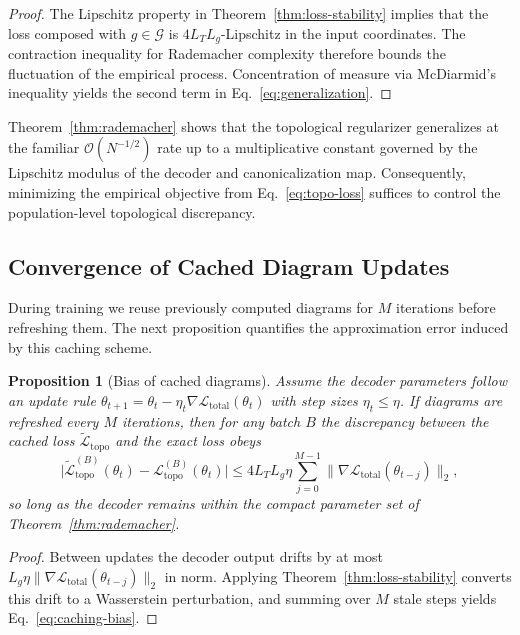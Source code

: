 \documentclass[11pt]{article}
\newtheorem{proposition}{Proposition}
\theoremstyle{definition}
\begin{document}
\begin{proof}
The Lipschitz property in Theorem~\ref{thm:loss-stability} implies that the loss composed with $g \in \mathcal{G}$ is $4 L_T L_g$-Lipschitz in the input coordinates. The contraction inequality for Rademacher complexity therefore bounds the fluctuation of the empirical process. Concentration of measure via McDiarmid's inequality yields the second term in Eq.~\eqref{eq:generalization}.
\end{proof}

Theorem~\ref{thm:rademacher} shows that the topological regularizer generalizes at the familiar $\mathcal{O}(N^{-1/2})$ rate up to a multiplicative constant governed by the Lipschitz modulus of the decoder and canonicalization map. Consequently, minimizing the empirical objective from Eq.~\eqref{eq:topo-loss} suffices to control the population-level topological discrepancy.

\subsection{Convergence of Cached Diagram Updates}
During training we reuse previously computed diagrams for $M$ iterations before refreshing them. The next proposition quantifies the approximation error induced by this caching scheme.

\begin{proposition}[Bias of cached diagrams]
\label{prop:caching}
Assume the decoder parameters follow an update rule $\theta_{t+1} = \theta_t - \eta_t \nabla \mathcal{L}_{\text{total}}(\theta_t)$ with step sizes $\eta_t \leq \eta$. If diagrams are refreshed every $M$ iterations, then for any batch $B$ the discrepancy between the cached loss $\widetilde{\mathcal{L}}_{\text{topo}}$ and the exact loss obeys
\begin{equation}
    \big| \widetilde{\mathcal{L}}_{\text{topo}}^{(B)}(\theta_t) - \mathcal{L}_{\text{topo}}^{(B)}(\theta_t) \big| \leq 4 L_T L_g \eta \sum_{j=0}^{M-1} \| \nabla \mathcal{L}_{\text{total}}(\theta_{t-j}) \|_2,
    \label{eq:caching-bias}
\end{equation}
so long as the decoder remains within the compact parameter set of Theorem~\ref{thm:rademacher}.
\end{proposition}

\begin{proof}
Between updates the decoder output drifts by at most $L_g \eta \| \nabla \mathcal{L}_{\text{total}}(\theta_{t-j}) \|_2$ in norm. Applying Theorem~\ref{thm:loss-stability} converts this drift to a Wasserstein perturbation, and summing over $M$ stale steps yields Eq.~\eqref{eq:caching-bias}.
\end{proof}
\end{document}
